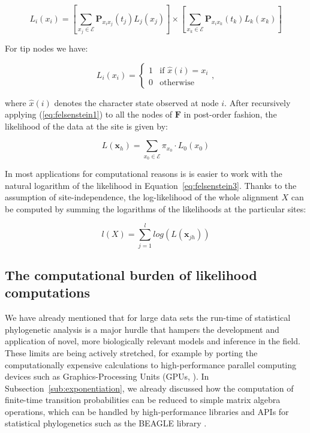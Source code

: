 \begin{equation}
L_{i}(x_{i})=\left[\underset{x_{j}\in \mathcal{E}}{\sum}\mathbf{P}_{x_{i}x_{j}}(t_{j})L_{j}(x_{j})\right]\times\left[\underset{x_{k}\in \mathcal{E}}{\sum}\mathbf{P}_{x_{i}x_{k}}(t_{k})L_{k}(x_{k})\right]
\label{eq:felsenstein1}
\end{equation}

\noindent
For tip nodes we have:

\begin{equation}
L_{i}(x_{i})=\begin{cases}
1 & \text{if }\hat{x}(i)=x_{i}\\
0 & \text{otherwise}
\end{cases},
\label{eq:felsenstein2}
\end{equation}

\noindent
where $\hat{x}(i)$ denotes the character state observed at node $i$.
After recursively applying (\ref{eq:felsenstein1}) to all the nodes of $\mathbf{F}$ in post-order fashion, the likelihood of the data at the site is given by:

\begin{equation}
L(\mathbf{x}_{h})=\underset{x_{0}\in\mathcal{E}}{\sum}\pi_{x_{0}}\cdot L_{0}(x_{0})
\label{eq:felsenstein3}
\end{equation}

\noindent
In most applications for computational reasons is is easier to work with the natural logarithm of the likelihood in Equation~\ref{eq:felsenstein3}.
Thanks to the assumption of site-independence, the log-likelihood of the whole alignment $X$ can be computed by summing the logarithms of the likelihoods at the particular sites:

\begin{equation}
l(X)=\underset{j=1}{\overset{l}{\sum}}log\left(L(\mathbf{x}_{jh})\right)
\label{eq:loglikelihood}
\end{equation}

\subsection{The computational burden of likelihood computations\label{sub:mlburden}}

We have already mentioned that for large data sets the run-time of statistical phylogenetic analysis is a major hurdle that hampers the development and application of novel, more biologically relevant models and inference in the field.
These limits are being actively stretched, for example by porting the computationally expensive calculations to high-performance parallel computing devices such as Graphics-Processing Units (GPUs, \cite{Nickolls2008}).
In Subsection~\ref{sub:exponentiation}, we already discussed how the computation of finite-time transition probabilities can be reduced to simple matrix algebra operations, which can be handled by high-performance libraries and APIs for statistical phylogenetics such as the BEAGLE library \citep{Ayres2012, Suchard2009}. 

